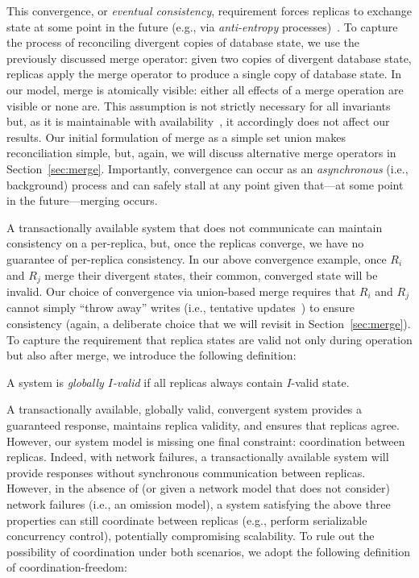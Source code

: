 This convergence, or \textit{eventual consistency}, requirement forces
replicas to exchange state at some point in the future (e.g., via
\textit{anti-entropy} processes)~\cite{vogels-defs,bayou}. To capture
the process of reconciling divergent copies of database state, we use
the previously discussed merge operator: given two copies of divergent
database state, replicas apply the merge operator to produce a single
copy of database state. In our model, merge is atomically visible:
either all effects of a merge operation are visible or none are. This
assumption is not strictly necessary for all invariants but, as it is
maintainable with availability~\cite{ramp-txns}, it accordingly does
not affect our results. Our initial formulation of merge as a simple
set union makes reconciliation simple, but, again, we will discuss
alternative merge operators in Section~\ref{sec:merge}. Importantly,
convergence can occur as an \textit{asynchronous} (i.e., background)
process and can safely stall at any point given that---at some point
in the future---merging occurs.

 A transactionally available system
that does not communicate can maintain consistency on a per-replica,
but, once the replicas converge, we have no guarantee of per-replica
consistency. In our above convergence example, once $R_i$ and $R_j$
merge their divergent states, their common, converged state will be
invalid. Our choice of convergence via union-based merge requires that
$R_i$ and $R_j$ cannot simply ``throw away'' writes (i.e., tentative
updates~\cite{tamer-book}) to ensure consistency (again, a deliberate
choice that we will revisit in Section~\ref{sec:merge}). To capture
the requirement that replica states are valid not only during
operation but also after merge, we introduce the following definition:

\begin{definition}
A system is \textit{globally $I$-valid} if all replicas always contain
$I$-valid state.
\end{definition}

 A transactionally available, globally valid,
convergent system provides a guaranteed response, maintains replica
validity, and ensures that replicas agree. However, our system model
is missing one final constraint: coordination between
replicas. Indeed, with network failures, a transactionally available
system will provide responses without synchronous communication
between replicas. However, in the absence of (or given a network model
that does not consider) network failures (i.e., an omission model), a
system satisfying the above three properties can still coordinate
between replicas (e.g., perform serializable concurrency control),
potentially compromising scalability. To rule out the possibility of
coordination under both scenarios, we adopt the following definition
of coordination-freedom:

